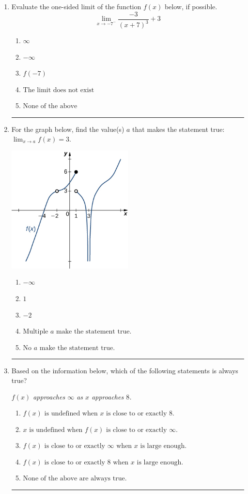 \documentclass[14pt]{extbook}
\newcommand{\litem}[1]{\item#1\hspace*{-1cm}\rule{\textwidth}{0.4pt}}
\begin{document}
\begin{enumerate}
{\begin{enumerate}[label=\Alph*.]
\end{enumerate} }
\litem{
Evaluate the one-sided limit of the function $f(x)$ below, if possible.\[ \lim_{x \rightarrow -7^-} \frac{-3}{(x+7)^3}+3 \]\begin{enumerate}[label=\Alph*.]
\item \( \infty \)
\item \( -\infty \)
\item \( f(-7) \)
\item \( \text{The limit does not exist} \)
\item \( \text{None of the above} \)

\end{enumerate} }
\litem{
For the graph below, find the value(s) $a$ that makes the statement true: $ \displaystyle \lim_{x \rightarrow a} f(x) = 3$.
\begin{center}
    \includegraphics[width=0.5\textwidth]{../Figures/evaluateLimitGraphicallyCopyB.png}
\end{center}
\begin{enumerate}[label=\Alph*.]
\item \( -\infty \)
\item \( 1 \)
\item \( -2 \)
\item \( \text{Multiple } a \text{ make the statement true}. \)
\item \( \text{No } a \text{ make the statement true}. \)

\end{enumerate} }
\litem{
Based on the information below, which of the following statements is always true?
\begin{center}
    \textit{ $f(x)$ approaches $\infty$ as $x$ approaches $8$. }
\end{center}
\begin{enumerate}[label=\Alph*.]
\item \( f(x) \text{ is undefined when } x \text{ is close to or exactly } 8. \)
\item \( x \text{ is undefined when } f(x) \text{ is close to or exactly } \infty. \)
\item \( f(x) \text{ is close to or exactly } \infty \text{ when } x \text{ is large enough}. \)
\item \( f(x) \text{ is close to or exactly } 8 \text{ when } x \text{ is large enough}. \)
\item \( \text{None of the above are always true.} \)


\end{enumerate}}
\end{enumerate}
\end{document}
